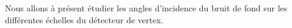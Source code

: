   \medskip
  
  
  \medskip
  
  Nous allons \`a pr\'esent \'etudier les angles d'incidence du bruit de fond sur les diff\'erentes \'echelles du d\'etecteur de vertex. 
  

  
